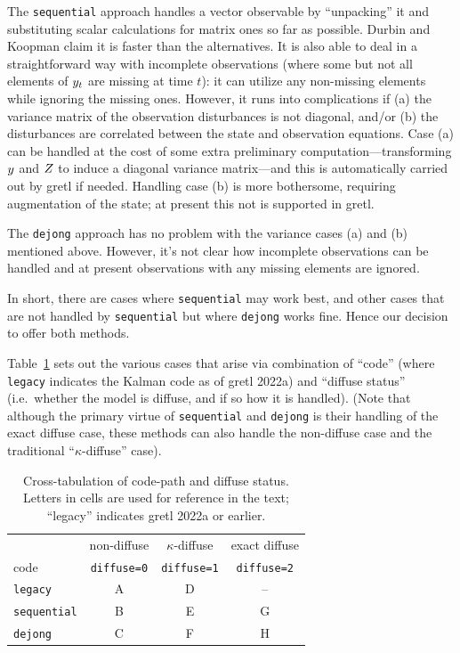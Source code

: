 The \texttt{sequential} approach handles a vector observable by
``unpacking'' it and substituting scalar calculations for matrix ones
so far as possible. Durbin and Koopman claim it is faster than the
alternatives. It is also able to deal in a straightforward way with
incomplete observations (where some but not all elements of
$y_t$ are missing at time $t$): it can utilize any non-missing
elements while ignoring the missing ones.  However, it runs into
complications if (a) the variance matrix of the observation
disturbances is not diagonal, and/or (b) the disturbances are
correlated between the state and observation equations. Case (a) can
be handled at the cost of some extra preliminary
computation---transforming $y$ and $Z$ to induce a
diagonal variance matrix---and this is automatically carried out by
gretl if needed. Handling case (b) is more bothersome, requiring
augmentation of the state; at present this not is supported in gretl.

The \texttt{dejong} approach has no problem with the variance cases
(a) and (b) mentioned above. However, it's not clear how incomplete
observations can be handled and at present observations with any
missing elements are ignored.

In short, there are cases where \texttt{sequential} may work best, and
other cases that are not handled by \texttt{sequential} but where
\texttt{dejong} works fine. Hence our decision to offer both
methods.

Table~\ref{tab:code-diffuse} sets out the various cases that arise via
combination of ``code'' (where \texttt{legacy} indicates the Kalman code
as of gretl 2022a) and ``diffuse status'' (i.e.\ whether the model is
diffuse, and if so how it is handled). (Note that although the primary
virtue of \texttt{sequential} and \texttt{dejong} is their handling of
the exact diffuse case, these methods can also handle the non-diffuse
case and the traditional ``$\kappa$-diffuse'' case).

\begin{table}[htbp]
\begin{center}
\begin{tabular}{lccc}
   & non-diffuse & $\kappa$-diffuse & exact diffuse \\
  code & \texttt{diffuse=0} & \texttt{diffuse=1} & \texttt{diffuse=2} \\[4pt]
  \texttt{legacy} & A & D & -- \\
  \texttt{sequential} & B & E & G \\
  \texttt{dejong} & C & F & H
\end{tabular}
\caption{Cross-tabulation of code-path and diffuse status. Letters in
  cells are used for reference in the text; ``legacy'' indicates gretl
  2022a or earlier.}
\label{tab:code-diffuse}
\end{center}
\end{table}


